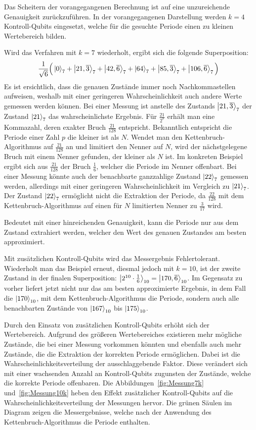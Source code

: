 Das Scheitern der vorangegangenen Berechnung ist auf eine unzureichende Genauigkeit zurückzuführen. 
In der vorangegangenen Darstellung werden \(k=4\) Kontroll-Qubits eingesetzt, 
welche für die gesuchte Periode einen zu kleinen Wertebereich bilden.

Wird das Verfahren mit \(k=7\) wiederholt, ergibt sich die folgende Superposition:
\[\frac{1}{\sqrt{6}}
\Big(\ket{0}_7 +\ket{21,\overline{3}}_7 + \ket{42,\overline{6}}_7+
\ket{64}_7+\ket{85,\overline{3}}_7 + \ket{106,\overline{6}}_7
\Big) \]
Es ist ersichtlich, dass die genauen Zustände immer noch Nachkommastellen aufweisen, 
weshalb mit einer geringeren Wahrscheinlichkeit auch andere Werte gemessen werden können.
Bei einer Messung ist anstelle des Zustands \(\ket{21,\overline{3}}_7\) der Zustand \(\ket{21}_7\) das wahrscheinlichste Ergebnis.
Für \(\frac{21}{2^{7}}\) erhält man eine Kommazahl, deren exakter Bruch \(\frac{21}{128}\) entspricht.
Bekanntlich entspricht die Periode einer Zahl \(p\) die kleiner ist als \(N\).
Wendet man den Kettenbruch-Algorithmus auf \(\frac{21}{128}\) an und limitiert den Nenner auf \(N\), 
wird der nächstgelegene Bruch mit einem Nenner gefunden, der kleiner als \(N\) ist.
Im konkreten Beispiel ergibt sich aus \(\frac{21}{128}\) der Bruch \(\frac{1}{6}\), 
welcher die Periode im Nenner offenbart.
Bei einer Messung könnte auch der benachbarte ganzzahlige Zustand \(\ket{22}_7\) gemessen werden, 
allerdings mit einer geringeren Wahrscheinlichkeit im Vergleich zu \(\ket{21}_7\).
Der Zustand \(\ket{22}_7\) ermöglicht nicht die Extraktion der Periode, 
da \(\frac{22}{128}\) mit dem Kettenbruch-Algorithmus auf einen für \(N\) limitierten Nenner
zu \(\frac{3}{17}\) wird.

Bedeutet mit einer hinreichenden Genauigkeit, kann die Periode nur aus dem Zustand extrahiert werden, 
welcher den Wert des genauen Zustandes am besten approximiert.

Mit zusätzlichen Kontroll-Qubits wird das Messergebnis Fehlertolerant.
Wiederholt man das Beispiel erneut, diesmal jedoch mit \(k=10\), 
ist der zweite Zustand in der finalen Superposition: 
\(\ket{2^{10} \cdot \frac{1}{6}}_{10} =\ket{170,\overline{6}}_{10}\).
Im Gegensatz zu vorher liefert jetzt nicht nur das am besten approximierte Ergebnis, 
in dem Fall die \(\ket{170}_{10}\), mit dem Kettenbruch-Algorithmus die Periode, 
sondern auch alle benachbarten Zustände von \(\ket{167}_{10}\) bis \(\ket{175}_{10}\).

Durch den Einsatz von zusätzlichen Kontroll-Qubits erhöht sich der Wertebereich. 
Aufgrund des größeren Wertebereiches existieren mehr mögliche Zustände, 
die bei einer Messung vorkommen könnten und ebenfalls auch mehr Zustände, 
die die Extraktion der korrekten Periode ermöglichen. 
Dabei ist die Wahrscheinlichkeitsverteilung der ausschlaggebende Faktor. 
Diese verändert sich mit einer wachsenden Anzahl an Kontroll-Qubits zugunsten der Zustände, 
welche die korrekte Periode offenbaren.
Die Abbildungen~\ref{fig:Messung7k} und~\ref{fig:Messung10k} 
heben den Effekt zusätzlicher Kontroll-Qubits auf die Wahrscheinlichkeitsverteilung der Messungen hervor.
Die grünen Säulen im Diagram zeigen die Messergebnisse, 
welche nach der Anwendung des Kettenbruch-Algorithmus die Periode enthalten.


